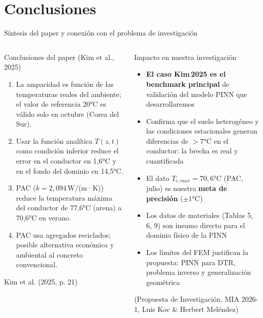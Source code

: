 \documentclass[aspectratio=169]{beamer}
\newcommand{\refcite}[1]{{\footnotesize\color{gray!70!black} #1}}
\begin{document}
\section{Conclusiones}

\begin{frame}{Síntesis del paper y conexión con el problema de investigación}
\begin{columns}[T]
\begin{block}{\small Conclusiones del paper (Kim et al., 2025)}
\scriptsize\justifying
\begin{enumerate}[leftmargin=*, itemsep=2pt]
  \item[(i)] La ampacidad es función de las temperaturas reales del
        ambiente; el valor de referencia 20°C es válido solo en octubre
        (Corea del Sur).
  \item[(ii)] Usar la función analítica $T(z,t)$ como condición inferior
        reduce el error en el conductor en 1,6°C y en el fondo del dominio
        en 14,5°C.
  \item[(iii)] PAC ($k = 2{,}094$\,W/(m·K)) reduce la temperatura máxima
        del conductor de 77,6°C (arena) a 70,6°C en verano.
  \item[(iv)] PAC usa agregados reciclados; posible alternativa
        económica y ambiental al concreto convencional.
\end{enumerate}
\refcite{Kim et al. (2025, p. 21)}
\end{block}

\begin{exampleblock}{\small Impacto en nuestra investigación}
\scriptsize\justifying
\begin{itemize}[leftmargin=*, itemsep=3pt]
  \item \textbf{El caso Kim\,2025 es el benchmark principal} de
        validación del modelo PINN que desarrollaremos
  \item Confirma que el suelo heterogéneo y las condiciones estacionales
        generan diferencias de $>7$°C en el conductor: la brecha es real
        y cuantificada
  \item El dato $T_{c,max}=70{,}6$°C (PAC, julio) es nuestra
        \textbf{meta de precisión} ($\pm 1$°C)
  \item Los datos de materiales (Tablas 5, 6, 9) son insumo directo
        para el dominio físico de la PINN
  \item Los límites del FEM justifican la propuesta: PINN para DTR,
        problema inverso y generalización geométrica
\end{itemize}
\refcite{(Propuesta de Investigación, MIA 2026-1, Luis Koc \& Herbert Meléndez)}
\end{exampleblock}
\end{columns}
\end{frame}
\end{document}

